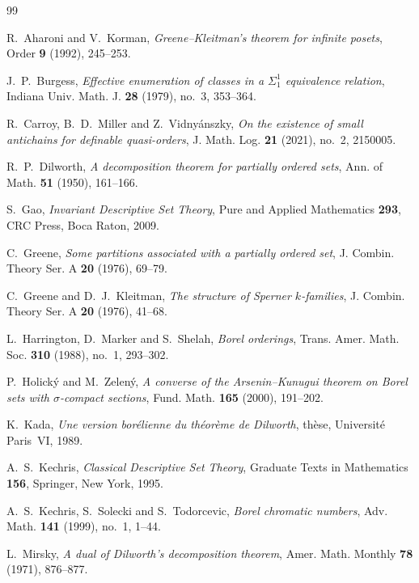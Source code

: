 \documentclass[11pt,reqno]{amsart}
\theoremstyle{plain}
\theoremstyle{definition}
\theoremstyle{remark}
\begin{document}
\begin{thebibliography}{99}

R.~Aharoni and V.~Korman,
\emph{Greene--Kleitman's theorem for infinite posets},
Order \textbf{9} (1992), 245--253.

J.~P.~Burgess,
\emph{Effective enumeration of classes in a $\Sigma^1_1$ equivalence relation},
Indiana Univ. Math. J. \textbf{28} (1979), no.~3, 353--364.

R.~Carroy, B.~D.~Miller and Z.~Vidny\'anszky,
\emph{On the existence of small antichains for definable quasi-orders},
J. Math. Log. \textbf{21} (2021), no.~2, 2150005.

R.~P.~Dilworth,
\emph{A decomposition theorem for partially ordered sets},
Ann. of Math. \textbf{51} (1950), 161--166.

S.~Gao,
\emph{Invariant Descriptive Set Theory},
Pure and Applied Mathematics \textbf{293}, CRC Press, Boca Raton, 2009.

C.~Greene,
\emph{Some partitions associated with a partially ordered set},
J. Combin. Theory Ser. A \textbf{20} (1976), 69--79.

C.~Greene and D.~J.~Kleitman,
\emph{The structure of Sperner $k$-families},
J. Combin. Theory Ser. A \textbf{20} (1976), 41--68.

L.~Harrington, D.~Marker and S.~Shelah,
\emph{Borel orderings},
Trans. Amer. Math. Soc. \textbf{310} (1988), no.~1, 293--302.

P.~Holick\'y and M.~Zelen\'y,
\emph{A converse of the Arsenin--Kunugui theorem on Borel sets with
$\sigma$-compact sections},
Fund. Math. \textbf{165} (2000), 191--202.

K.~Kada,
\emph{Une version bor\'elienne du th\'eor\`eme de Dilworth},
th\`ese, Universit\'e Paris~VI, 1989.

A.~S.~Kechris,
\emph{Classical Descriptive Set Theory},
Graduate Texts in Mathematics \textbf{156}, Springer, New York, 1995.

A.~S.~Kechris, S.~Solecki and S.~Todorcevic,
\emph{Borel chromatic numbers},
Adv. Math. \textbf{141} (1999), no.~1, 1--44.

L.~Mirsky,
\emph{A dual of Dilworth's decomposition theorem},
Amer. Math. Monthly \textbf{78} (1971), 876--877.

\end{thebibliography}
\end{document}
